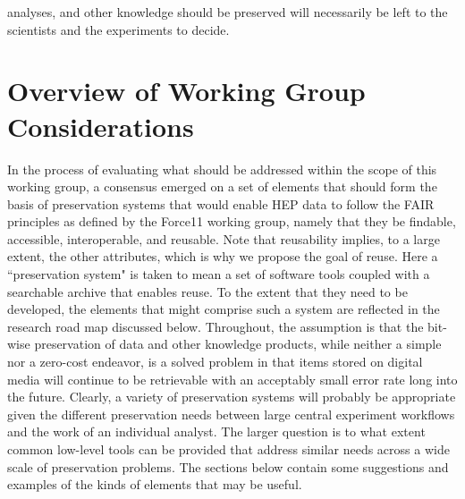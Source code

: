 \documentclass[11pt]{article}
\begin{document}
analyses, and other knowledge should be preserved will necessarily be left to the scientists and the experiments to decide.

\hypertarget{WGOverview}{%
\section{Overview of Working Group Considerations}\label{WGOverview}}
In the process of evaluating what should be addressed within the scope of this working group, a consensus emerged on a set of elements that should form the basis of preservation systems that would enable HEP data to follow the FAIR principles as defined by the Force11 working group\cite{F11}, namely that they be findable, accessible, interoperable, and reusable.  Note that reusability implies, to a large extent, the other attributes, which is why we propose the goal of reuse.  Here a ``preservation system" is taken to mean a set of software tools coupled with a searchable archive that enables reuse. To the extent that they need to be developed, the elements that might comprise such a system are reflected in the research road map discussed below.  Throughout, the assumption is that the bit-wise preservation of data and other knowledge products, while neither a simple nor a zero-cost endeavor, is a solved problem in that items stored on digital media will continue to be retrievable with an acceptably small error rate long into the future.  Clearly, a variety of preservation systems will probably be appropriate given the different preservation needs between large central experiment workflows and the work of an individual analyst.  The larger question is to what extent common low-level tools can be provided that address similar needs across a wide scale of preservation problems.  The sections below contain some suggestions and examples of the kinds of elements that may be useful.
\end{document}
